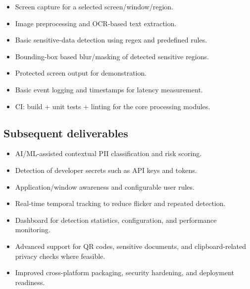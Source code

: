 \documentclass[12pt,a4paper]{article}
\begin{document}
\begin{itemize}
    \item Screen capture for a selected screen/window/region.

    \item Image preprocessing and OCR-based text extraction.

    \item Basic sensitive-data detection using regex and predefined rules.

    \item Bounding-box based blur/masking of detected sensitive regions.

    \item Protected screen output for demonstration.

    \item Basic event logging and timestamps for latency measurement.

    \item CI: build + unit tests + linting for the core processing modules.
\end{itemize}

\subsection{Subsequent deliverables}

\begin{itemize}
    \item AI/ML-assisted contextual PII classification and risk scoring.

    \item Detection of developer secrets such as API keys and tokens.

    \item Application/window awareness and configurable user rules.

    \item Real-time temporal tracking to reduce flicker and repeated detection.

    \item Dashboard for detection statistics, configuration, and performance monitoring.

    \item Advanced support for QR codes, sensitive documents, and clipboard-related privacy checks where feasible.

    \item Improved cross-platform packaging, security hardening, and deployment readiness.
\end{itemize}
\end{document}
